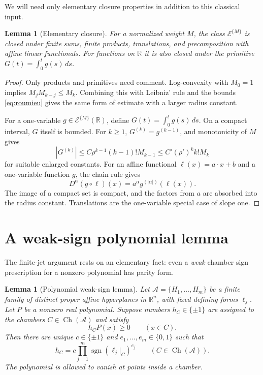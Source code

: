 \documentclass[11pt]{article}
\newtheorem{lemma}[theorem]{Lemma}
\theoremstyle{definition}
\theoremstyle{remark}
\newcommand{\R}{\mathbb{R}}
\newcommand{\bits}{\{0,1\}}
\newcommand{\sign}{\operatorname{sgn}}
\newcommand{\Ch}{\operatorname{Ch}}
\newcommand{\cA}{\mathcal{A}}
\begin{document}
We will need only elementary closure properties in addition to this classical input.

\begin{lemma}[Elementary closure]\label{lem:closure}
For a normalized weight $M$, the class $\mathcal{E}^{\{M\}}$ is closed under finite sums, finite products, translations, and precomposition with affine linear functionals. For functions on $\R$ it is also closed under the primitive $G(t)=\int_0^t g(s)\,ds$.
\end{lemma}

\begin{proof}
Only products and primitives need comment. Log-convexity with $M_0=1$ implies $M_jM_{k-j}\le M_k$. Combining this with Leibniz' rule and the bounds \eqref{eq:roumieu} gives the same form of estimate with a larger radius constant.

For a one-variable $g\in\mathcal{E}^{\{M\}}(\R)$, define $G(t)=\int_0^t g(s)\,ds$. On a compact interval, $G$ itself is bounded. For $k\ge1$, $G^{(k)}=g^{(k-1)}$, and monotonicity of $M$ gives
\[
 |G^{(k)}|
 \le C\rho^{k-1}(k-1)!M_{k-1}
 \le C'({\rho}')^k k!M_k
\]
for suitable enlarged constants. For an affine functional $\ell(x)=a\cdot x+b$ and a one-variable function $g$, the chain rule gives
\[
 D^\alpha(g\circ\ell)(x)=a^\alpha g^{(|\alpha|)}(\ell(x)).
\]
The image of a compact set is compact, and the factors from $a$ are absorbed into the radius constant. Translations are the one-variable special case of slope one.
\end{proof}

\section{A weak-sign polynomial lemma}\label{sec:polynomial}

The finite-jet argument rests on an elementary fact: even a \emph{weak} chamber sign prescription for a nonzero polynomial has parity form.

\begin{lemma}[Polynomial weak-sign lemma]\label{thm:T1}
Let $\cA=\{H_1,\dots,H_m\}$ be a finite family of distinct proper affine hyperplanes in $\R^n$, with fixed defining forms $\ell_j$. Let $P$ be a nonzero real polynomial. Suppose numbers $h_C\in\{\pm1\}$ are assigned to the chambers $C\in\Ch(\cA)$ and satisfy
\begin{equation}\label{eq:weaksign}
 h_C P(x)\ge0
 \qquad (x\in C).
\end{equation}
Then there are unique $c\in\{\pm1\}$ and $e_1,\dots,e_m\in\bits$ such that
\begin{equation}\label{eq:polyparity}
 h_C=c\prod_{j=1}^m\sign(\ell_j|_C)^{e_j}
 \qquad(C\in\Ch(\cA)).
\end{equation}
The polynomial is allowed to vanish at points inside a chamber.
\end{lemma}
\end{document}
